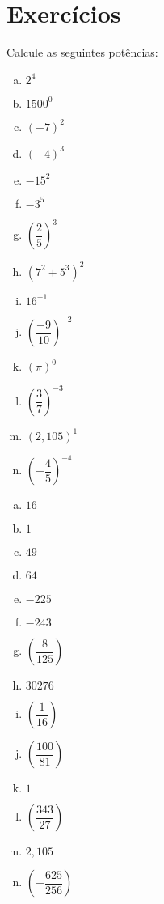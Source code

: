 \section{Exercícios}


\begin{exer}
Calcule as seguintes potências:
\begin{multicols}{2}
\begin{enumerate}[a)]
\item $2^4$ 
\item $1500^0$
\item $(-7)^2$
\item $(-4)^3$
\item $-15^2$
\item $-3^5$
\item $\left(\dfrac{2}{5}\right)^3$
\item $(7^2 + 5^3)^2$
\item $16^{-1}$
\item $\left(\dfrac{-9}{10}\right)^{-2}$
\item $(\pi)^0$
\item $\left(\dfrac{3}{7}\right)^{-3}$
\item $(2,105)^1$
\item $\left( - \dfrac{4}{5} \right)^{-4}$
\end{enumerate}
\end{multicols}
\end{exer}
\begin{resp}
  \begin{multicols}{4}
\begin{enumerate}[a)]
\item $16$ 
\item $1$
\item $49$
\item $64$
\item $ -225$
\item $-243$
\item $\left(\dfrac{8}{125}\right)$
\item $30276$
\item $\left(\dfrac{1}{16}\right)$
\item $\left(\dfrac{100}{81}\right)$
\item $1$
\item $\left(\dfrac{343}{27}\right)$
\item $2,105$
\item $\left( - \dfrac{625}{256}\right)$
\end{enumerate}
\end{multicols}
\end{resp}

